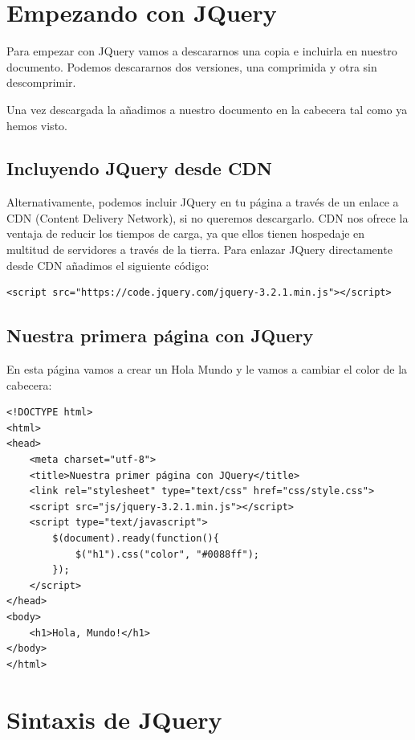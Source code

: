 \documentclass[a4paper, oneside]{article}
\begin{document}
\section{Empezando con JQuery}
\label{sec:org749892a}

Para empezar con JQuery vamos a descararnos una copia e incluirla en nuestro documento. Podemos descararnos dos versiones, una comprimida y otra sin 
descomprimir. 

Una vez descargada la añadimos a nuestro documento en la cabecera tal como ya hemos visto. 

\subsection{Incluyendo JQuery desde CDN}
\label{sec:org62fe1ca}

Alternativamente, podemos incluir JQuery en tu página a través de un enlace a CDN (Content Delivery Network), si no queremos descargarlo. CDN nos ofrece la ventaja de reducir los tiempos de carga, ya que ellos tienen hospedaje en multitud de servidores a través de la tierra. Para enlazar JQuery directamente desde CDN añadimos el siguiente código:

\begin{verbatim}
<script src="https://code.jquery.com/jquery-3.2.1.min.js"></script>
\end{verbatim}

\subsection{Nuestra primera página con JQuery}
\label{sec:orgb2c19ff}

En esta página vamos a crear un Hola Mundo y le vamos a cambiar el color de la cabecera:

\begin{verbatim}
<!DOCTYPE html>
<html>
<head>
    <meta charset="utf-8">
    <title>Nuestra primer página con JQuery</title>
    <link rel="stylesheet" type="text/css" href="css/style.css">
    <script src="js/jquery-3.2.1.min.js"></script>
    <script type="text/javascript">
        $(document).ready(function(){
            $("h1").css("color", "#0088ff");
        });
    </script>
</head>
<body>
    <h1>Hola, Mundo!</h1>
</body>
</html>
\end{verbatim}

\section{Sintaxis de JQuery}
\label{sec:org2cb14e1}
\end{document}
